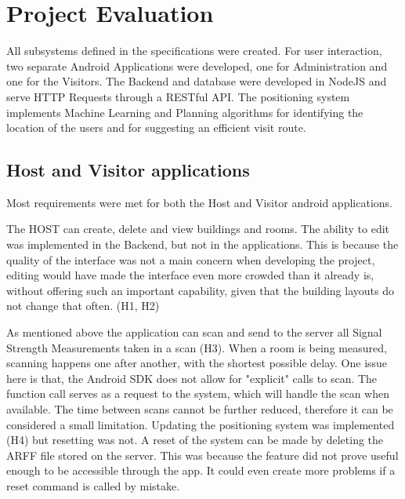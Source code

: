\section{Project Evaluation}
All subsystems defined in the specifications were created. For user interaction, two separate Android Applications were developed, one for Administration and one for the Visitors. The Backend and database were developed in NodeJS and serve HTTP Requests through a RESTful API. The positioning system implements Machine Learning and Planning algorithms for identifying the location of the users and for suggesting an efficient visit route.

\subsection{Host and Visitor applications}
Most requirements were met for both the Host and Visitor android applications. 

The HOST can create, delete and view buildings and rooms. The ability to edit was implemented in the Backend, but not in the applications. This is because the quality of the interface was not a main concern when developing the project, editing would have made the interface even more crowded than it already is, without offering such an important capability, given that the building layouts do not change that often. (H1, H2)

As mentioned above the application can scan and send to the server all Signal Strength Measurements taken in a scan (H3). When a room is being measured, scanning happens one after another, with the shortest possible delay. One issue here is that, the Android SDK does not allow for "explicit" calls to scan. The function call serves as a request to the system, which will handle the scan when available. The time between scans cannot be further reduced, therefore it can be considered a small limitation. Updating the positioning system was implemented (H4) but resetting was not. A reset of the system can be made by deleting the ARFF file stored on the server. This was because the feature did not prove useful enough to be accessible through the app. It could even create more problems if a reset command is called by mistake. 

